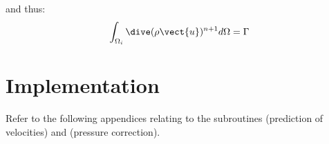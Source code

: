 and thus:
\begin{equation}\notag
\int_{\Omega_i}{\dive(\rho \vect{u})^{n+1}  d\Omega} = \Gamma
\end{equation}

\section*{Implementation}

Refer to the following appendices relating to the subroutines
 (prediction of velocities) and 
(pressure correction).
